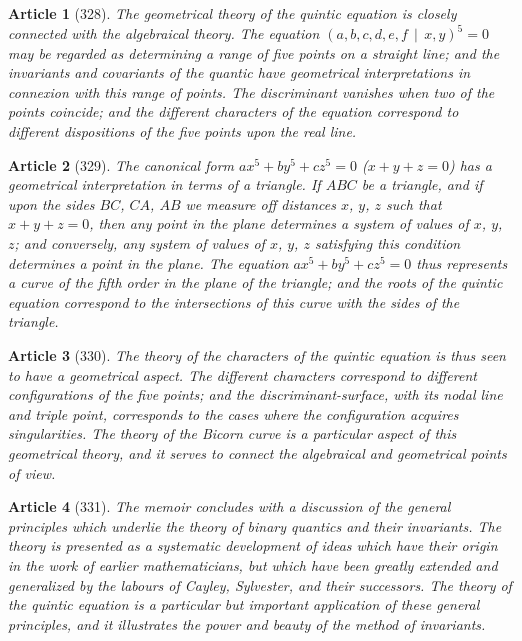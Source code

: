\documentclass[11pt,a4paper]{article}
\theoremstyle{cayley}
\newtheorem{art}{Article}
\begin{document}
\begin{art}[328]
The geometrical theory of the quintic equation is closely connected with the algebraical theory. The equation $(a, b, c, d, e, f \,\mid\, x, y)^5 = 0$ may be regarded as determining a range of five points on a straight line; and the invariants and covariants of the quantic have geometrical interpretations in connexion with this range of points. The discriminant vanishes when two of the points coincide; and the different characters of the equation correspond to different dispositions of the five points upon the real line.
\end{art}

\begin{art}[329]
The canonical form $ax^5 + by^5 + cz^5 = 0$ ($x+y+z=0$) has a geometrical interpretation in terms of a triangle. If $ABC$ be a triangle, and if upon the sides $BC$, $CA$, $AB$ we measure off distances $x$, $y$, $z$ such that $x+y+z=0$, then any point in the plane determines a system of values of $x$, $y$, $z$; and conversely, any system of values of $x$, $y$, $z$ satisfying this condition determines a point in the plane. The equation $ax^5 + by^5 + cz^5 = 0$ thus represents a curve of the fifth order in the plane of the triangle; and the roots of the quintic equation correspond to the intersections of this curve with the sides of the triangle.
\end{art}

\begin{art}[330]
The theory of the characters of the quintic equation is thus seen to have a geometrical aspect. The different characters correspond to different configurations of the five points; and the discriminant-surface, with its nodal line and triple point, corresponds to the cases where the configuration acquires singularities. The theory of the Bicorn curve is a particular aspect of this geometrical theory, and it serves to connect the algebraical and geometrical points of view.
\end{art}

\begin{art}[331]
The memoir concludes with a discussion of the general principles which underlie the theory of binary quantics and their invariants. The theory is presented as a systematic development of ideas which have their origin in the work of earlier mathematicians, but which have been greatly extended and generalized by the labours of Cayley, Sylvester, and their successors. The theory of the quintic equation is a particular but important application of these general principles, and it illustrates the power and beauty of the method of invariants.
\end{art}
\end{document}
